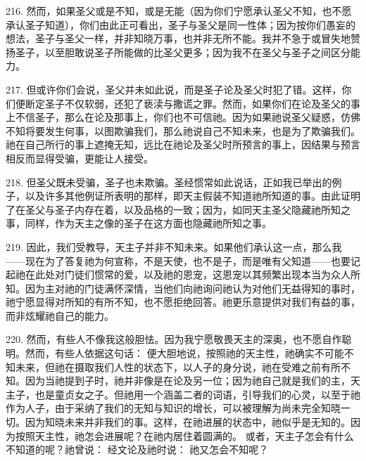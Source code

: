 216. 然而，如果圣父或是不知，或是无能（因为你们宁愿承认圣父不知，也不愿承认圣子知道），你们由此正可看出，圣子与圣父是同一性体；因为按你们愚妄的想法，圣子与圣父一样，并非知晓万事，也并非无所不能。我并不急于或冒失地赞扬圣子，以至胆敢说圣子所能做的比圣父更多；因为我不在圣父与圣子之间区分能力。\par

217. 但或许你们会说，圣父并未如此说，而是圣子论及圣父时犯了错。这样，你们便断定圣子不仅软弱，还犯了亵渎与撒谎之罪。然而，如果你们在论及圣父的事上不信圣子，那么在论及那事上，你们也不可信祂。因为如果祂说圣父疑惑，仿佛不知将要发生何事，以图欺骗我们，那么祂说自己不知未来，也是为了欺骗我们。祂在自己所行的事上遮掩无知，远比在祂论及圣父时所预言的事上，因结果与预言相反而显得受骗，更能让人接受。\par

218. 但圣父既未受骗，圣子也未欺骗。圣经惯常如此说话，正如我已举出的例子，以及许多其他例证所表明的那样，即天主假装不知道祂所知道的事。由此证明了在圣父与圣子内存在着，以及品格的一致；因为，如同天主圣父隐藏祂所知之事，同样，作为天主之像的圣子在这方面也隐藏祂所知之事。\par

\par

219. 因此，我们受教导，天主子并非不知未来。如果他们承认这一点，那么我——现在为了答复祂为何宣称，不是天使，也不是子，而是唯有父知道——也要记起祂在此处对门徒们惯常的爱，以及祂的恩宠，这恩宠以其频繁出现本当为众人所知。因为主对祂的门徒满怀深情，当他们向祂询问祂认为对他们无益得知的事时，祂宁愿显得对所知的有所不知，也不愿拒绝回答。祂更乐意提供对我们有益的事，而非炫耀祂自己的能力。\par

220. 然而，有些人不像我这般胆怯。因为我宁愿敬畏天主的深奥，也不愿自作聪明。然而，有些人依据这句话：  便大胆地说，按照祂的天主性，祂确实不可能不知未来，但祂在摄取我们人性的状态下，以人子的身分说，祂在受难之前有所不知。因为当祂提到子时，祂并非像是在论及另一位；因为祂自己就是我们的主，天主子，也是童贞女之子。但祂用一个涵盖二者的词语，引导我们的心灵，以至于祂作为人子，由于采纳了我们的无知与知识的增长，可以被理解为尚未完全知晓一切。因为知晓未来并非我们的事。这样，在祂进展的状态中，祂似乎是无知的。因为按照天主性，祂怎会进展呢？在祂内居住着圆满的。 或者，天主子怎会有什么不知道的呢？祂曾说：  经文论及祂时说：  祂又怎会不知呢？\par

